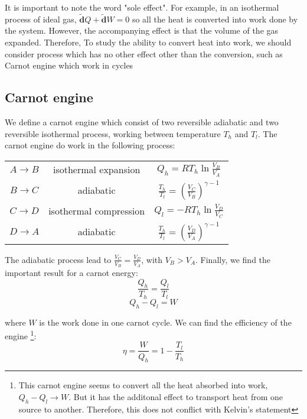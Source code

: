 \documentclass{article}
\newcommand{\dbar}{\mathbf{\tilde{d}}}
\begin{document}
It is important to note the word "sole effect". For example, in an isothermal process of ideal gas, 
$\dbar Q + \dbar W = 0$ so all the heat is converted into work done by the system. However, the 
accompanying effect is that the volume of the gas expanded. 
Therefore, To study the ability to convert heat into work, we should consider process which has no 
other effect other than the conversion, such as Carnot engine which work in cycles

\subsection{Carnot engine}
We define a carnot engine which consist of two reversible adiabatic and two reversible 
isothermal process, working between temperature $T_h$ and $T_l$. The carnot engine do work
in the following process:

\begin{table*}[h]
    \centering
    \begin{tabular}{ccc}
        $ A \to B $ & isothermal expansion & $Q_h = RT_h \ln \frac{V_B}{V_A}$ \\
        $ B \to C $ & adiabatic & $ \frac{T_h}{T_l} = \left( \frac{V_C}{V_B} \right) ^ {\gamma-1} $ \\
        $ C \to D $ & isothermal compression & $Q_l = - RT_h \ln \frac{V_D}{V_C}$ \\
        $ D \to A $ & adiabatic & $ \frac{T_h}{T_l} = \left( \frac{V_D}{V_A} \right) ^ {\gamma-1}$ \\
    \end{tabular}
\end{table*}

The adiabatic process lead to $\frac{V_C}{V_B} = \frac{V_D}{V_A} $, with $V_B > V_A$. Finally, we 
find the important result for a carnot energy:
\[\boxed{\frac{Q_h}{T_h} = \frac{Q_l}{T_l} }\]
\begin{equation}
    Q_h - Q_l = W 
\end{equation}

where $W$ is the work done in one carnot cycle. We can find the efficiency of the engine
\footnote{This carnot engine seems to convert all the heat absorbed into work, $Q_h - Q_l \to W$. But
it has the additonal effect to transport heat from one source to another. Therefore, this does not 
conflict with Kelvin's statement}:
\begin{equation}
    \eta = \frac{W}{Q_h} = 1 - \frac{T_l}{T_h}
\end{equation}
\end{document}
